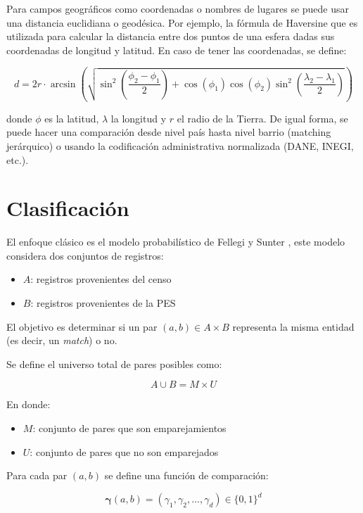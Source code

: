 \documentclass[
  12pt,
]{book}
\providecommand{\tightlist}{%
  \setlength{\itemsep}{0pt}\setlength{\parskip}{0pt}}
\begin{document}
Para campos geográficos como coordenadas o nombres de lugares se puede usar una distancia euclidiana o geodésica. Por ejemplo, la fórmula de Haversine que es utilizada para calcular la distancia entre dos puntos de una esfera dadas sus coordenadas de longitud y latitud. En caso de tener las coordenadas, se define:

\[d = 2r \cdot \arcsin\left( \sqrt{\sin^2\left(\frac{\phi_2 - \phi_1}{2}\right) + \cos(\phi_1) \cos(\phi_2) \sin^2\left(\frac{\lambda_2 - \lambda_1}{2}\right)} \right)\]

donde \(\phi\) es la latitud, \(\lambda\) la longitud y \(r\) el radio de la Tierra. De igual forma, se puede hacer una comparación desde nivel país hasta nivel barrio (matching jerárquico) o usando la codificación administrativa normalizada (DANE, INEGI, etc.).

\section{Clasificación}\label{clasificaciuxf3n}

El enfoque clásico es el modelo probabilístico de Fellegi y Sunter \citep{fellegi1969theory}, este modelo considera dos conjuntos de registros:

\begin{itemize}
\tightlist
\item
  \(A\): registros provenientes del censo
\item
  \(B\): registros provenientes de la PES
\end{itemize}

El objetivo es determinar si un par \((a, b) \in A \times B\) representa la misma entidad (es decir, un \emph{match}) o no.

Se define el universo total de pares posibles como:

\[A \cup B = M \times U\]

En donde:

\begin{itemize}
\tightlist
\item
  \(M\): conjunto de pares que son emparejamientos
\item
  \(U\): conjunto de pares que no son emparejados
\end{itemize}

Para cada par \((a, b)\) se define una función de comparación:

\[\boldsymbol{\gamma}(a, b) = (\gamma_1, \gamma_2, \dots, \gamma_d) \in \{0,1\}^d\]
\end{document}
